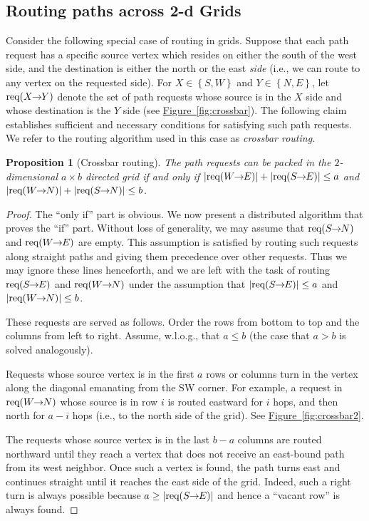 \documentclass[11pt]{article}
\newtheorem{proposition}[theorem]{Proposition}
\newcommand{\namedref}[2]{\hyperref[#2]{#1~\ref*{#2}}}
\newcommand{\figref}[1]{\namedref{Figure}{#1}}
\newenvironment{proof sketch}[1]{\noindent {\emph{Proof sketch of #1:}}}{\hfill \qed}
\newcommand{\Set}[1]{\left\{#1\right\}}
\newcommand{\ppp}[2]{\text{\rm req}(#1\!\!\rightarrow\!\!#2)}
\begin{document}
\subsection{Routing paths across 2-d
  Grids}
Consider the following special case of routing in grids.
Suppose that each path request has a specific source vertex which
resides on either the south of the west side, and the destination is
either the north or the east \emph{side} (i.e., we can route to any
vertex on the requested side).
  For $X\in\Set{S,W}$ and $Y\in\Set{N,E}$, let
$\ppp{X}{Y}$ denote the set of path requests whose source
is in the $X$ side and whose destination is the $Y$ side
(see \figref{fig:crossbar}).
The following claim establishes  sufficient and necessary conditions
for satisfying such path requests. We refer to the routing algorithm used in this
case as \emph{crossbar routing}.
\begin{proposition}[Crossbar routing]
\label{prop:crossbar}\sloppy
The path requests can be packed in the $2$-dimensional $a \times b$
directed grid  if and only if $|\ppp{W}{E}|+|\ppp{S}{E}|\leq a$ and
$|\ppp{W}{N}|+|\ppp{S}{N}|\leq b$.
\end{proposition}
\begin{proof}
  The ``only if'' part is obvious. We now present a distributed
  algorithm that proves the ``if'' part.  Without loss of generality,
  we may assume that $\ppp{S}{N}$ and $\ppp{W}{E}$ are empty. This
  assumption is satisfied by routing such requests along straight
  paths and giving them precedence over other requests. Thus we may
  ignore these lines henceforth, and we are left with the task of
  routing $\ppp{S}{E}$ and $\ppp{W}{N}$ under the assumption that
  $|\ppp{S}{E}|\leq a$ and $|\ppp{W}{N}|\leq b$.

  These requests are served as follows.  Order the rows from bottom
  to top and the columns from left to right. Assume, w.l.o.g.,  that $a\leq b$
  (the case that $a>b$ is solved analogously).

  Requests whose source vertex is in the first $a$ rows or columns
  turn in the vertex along the diagonal emanating from the SW
  corner. For example, a request in $\ppp{W}{N}$ whose source
  is in row $i$ is routed eastward for $i$ hops, and then
  north for $a-i$ hops (i.e., to the north side of the grid). See
  \figref{fig:crossbar2}.

  The requests whose source vertex is in the last $b-a$ columns are
  routed northward until they reach a vertex that does not receive an
  east-bound path from its west neighbor. Once such a vertex is found,
  the path turns east and continues straight until it reaches the east
  side of the grid.  Indeed, such a right turn is always possible
  because $a\geq |\ppp{S}{E}|$ and hence a ``vacant row'' is always
  found.
\end{proof}
\end{document}
